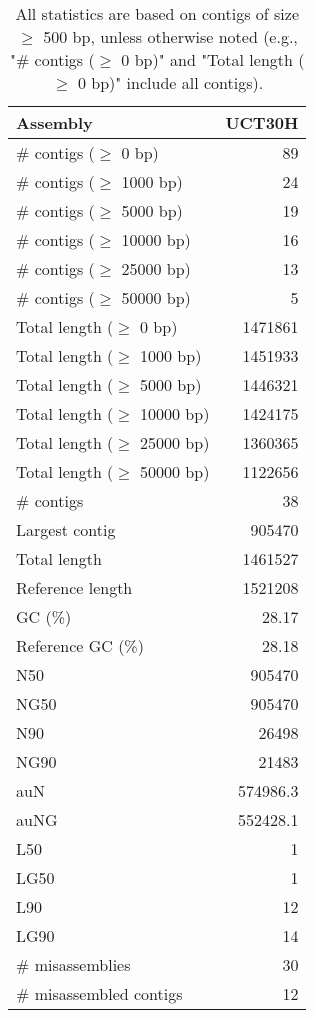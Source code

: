 \documentclass[12pt,a4paper]{article}
\begin{document}
\begin{table}[ht]
\begin{center}
\caption{All statistics are based on contigs of size $\geq$ 500 bp, unless otherwise noted (e.g., "\# contigs ($\geq$ 0 bp)" and "Total length ($\geq$ 0 bp)" include all contigs).}
\begin{tabular}{|l*{1}{|r}|}
\hline
Assembly & UCT30H \\ \hline
\# contigs ($\geq$ 0 bp) & 89 \\ \hline
\# contigs ($\geq$ 1000 bp) & 24 \\ \hline
\# contigs ($\geq$ 5000 bp) & 19 \\ \hline
\# contigs ($\geq$ 10000 bp) & 16 \\ \hline
\# contigs ($\geq$ 25000 bp) & 13 \\ \hline
\# contigs ($\geq$ 50000 bp) & 5 \\ \hline
Total length ($\geq$ 0 bp) & 1471861 \\ \hline
Total length ($\geq$ 1000 bp) & 1451933 \\ \hline
Total length ($\geq$ 5000 bp) & 1446321 \\ \hline
Total length ($\geq$ 10000 bp) & 1424175 \\ \hline
Total length ($\geq$ 25000 bp) & 1360365 \\ \hline
Total length ($\geq$ 50000 bp) & 1122656 \\ \hline
\# contigs & 38 \\ \hline
Largest contig & 905470 \\ \hline
Total length & 1461527 \\ \hline
Reference length & 1521208 \\ \hline
GC (\%) & 28.17 \\ \hline
Reference GC (\%) & 28.18 \\ \hline
N50 & 905470 \\ \hline
NG50 & 905470 \\ \hline
N90 & 26498 \\ \hline
NG90 & 21483 \\ \hline
auN & 574986.3 \\ \hline
auNG & 552428.1 \\ \hline
L50 & 1 \\ \hline
LG50 & 1 \\ \hline
L90 & 12 \\ \hline
LG90 & 14 \\ \hline
\# misassemblies & 30 \\ \hline
\# misassembled contigs & 12 \\ \hline

\end{tabular}
\end{center}
\end{table}
\end{document}
